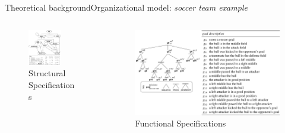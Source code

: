 \begin{frame}{Theoretical background}{Organizational model: \textit{soccer team example}}

    \vspace{-2.5ex}

    \begin{columns}
        \hspace{-16ex}
        \begin{column}{0.5\textwidth}
            \centering
            \begin{figure}[H]
                \includegraphics[width=0.7\textwidth]{figures/soccer_ss.png}
                \caption*{Structural Specifications}
            \end{figure}
        \end{column}
        \hspace{-20ex}
        \begin{column}{0.5\textwidth}
            \centering
            \begin{figure}[H]
                \centering
                \includegraphics[width=1.2\textwidth]{figures/soccer_fs.png}
                \caption*{Functional Specifications}
            \end{figure}
        \end{column}
    \end{columns}


\end{frame}
